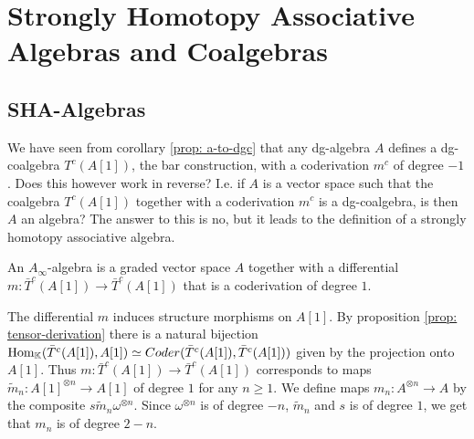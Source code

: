 \documentclass[../thesis.tex]{subfiles}
\begin{document}


    \section{Strongly Homotopy Associative Algebras and Coalgebras}\label{sec: 1.3}
    \subsection{SHA-Algebras}
        We have seen from corollary \ref{prop: a-to-dgc} that any dg-algebra $A$ defines a dg-coalgebra $T^c(A[1])$, the bar construction, with a coderivation $m^c$ of degree $-1$. Does this however work in reverse? I.e. if $A$ is a vector space such that the coalgebra $T^c(A[1])$ together with a coderivation $m^c$ is a dg-coalgebra, is then $A$ an algebra? The answer to this is no, but it leads to the definition of a strongly homotopy associative algebra.

        \begin{definition}
            An $A_\infty$-algebra is a graded vector space $A$ together with a differential $m:\bar{T}^c(A[1])\rightarrow\bar{T}^c(A[1])$ that is a coderivation of degree $1$.
        \end{definition}

        The differential $m$ induces structure morphisms on $A[1]$. By proposition \ref{prop: tensor-derivation} there is a natural bijection $\tt{Hom}_\mathbb{K}(\bar{T}^c(A[1]),A[1])\simeq Coder(\bar{T}^c(A[1]),\bar{T}^c(A[1]))$ given by the projection onto $A[1]$. Thus $m:\bar{T}^c(A[1])\rightarrow\bar{T}^c(A[1])$ corresponds to maps $\widetilde{m}_n:A[1]^{\otimes n}\rightarrow A[1]$ of degree $1$ for any $n\geq 1$. We define maps $m_n : A^{\otimes n}\rightarrow A$ by the composite $s\widetilde{m}_n \omega^{\otimes n}$. Since $\omega^{\otimes n}$ is of degree $-n$, $\widetilde{m}_n$ and $s$ is of degree $1$, we get that $m_n$ is of degree $2-n$.
        \begin{center}
        \end{center}
\end{document}
